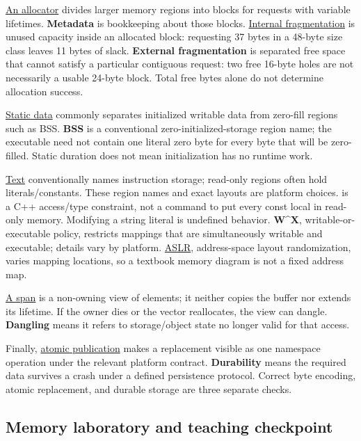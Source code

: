 \hyperref[appendix-c3480f7d9ff3]{An allocator} divides larger memory regions into blocks for requests with variable lifetimes. \textbf{Metadata} is bookkeeping about those blocks. \hyperref[appendix-a7c50686d81f]{Internal fragmentation} is unused capacity inside an allocated block: requesting 37 bytes in a 48-byte size class leaves 11 bytes of slack. \textbf{External fragmentation} is separated free space that cannot satisfy a particular contiguous request: two free 16-byte holes are not necessarily a usable 24-byte block. Total free bytes alone do not determine allocation success.

\hyperref[appendix-17c93c4c2f19]{Static data} commonly separates initialized writable data from zero-fill regions such as BSS. \textbf{BSS} is a conventional zero-initialized-storage region name; the executable need not contain one literal zero byte for every byte that will be zero-filled. Static duration does not mean initialization has no runtime work.

\hyperref[appendix-5f9e5e2f0a5e]{Text} conventionally names instruction storage; read-only regions often hold literals/constants. These region names and exact layouts are platform choices.  is a C++ access/type constraint, not a command to put every const local in read-only memory. Modifying a string literal is undefined behavior. \textbf{W\^{}X}, writable-or-executable policy, restricts mappings that are simultaneously writable and executable; details vary by platform. \hyperref[appendix-78cb248c8355]{ASLR}, address-space layout randomization, varies mapping locations, so a textbook memory diagram is not a fixed address map.

\hyperref[appendix-d52e4486f527]{A span} is a non-owning view of elements; it neither copies the buffer nor extends its lifetime. If the owner dies or the vector reallocates, the view can dangle. \textbf{Dangling} means it refers to storage/object state no longer valid for that access.

Finally, \hyperref[appendix-e89a8f290ef5]{atomic publication} makes a replacement visible as one namespace operation under the relevant platform contract. \textbf{Durability} means the required data survives a crash under a defined persistence protocol. Correct byte encoding, atomic replacement, and durable storage are three separate checks.

\subsection{Memory laboratory and teaching checkpoint}\label{01-foundations-i-ch002-memory-laboratory-and-teaching-checkpoint}

